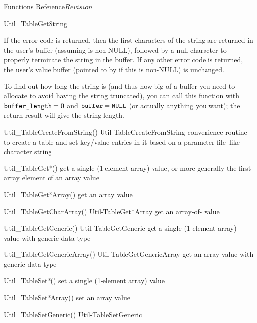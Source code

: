 \begin{cactuspart}{ Functions Reference}{}{$Revision$}
\begin{FunctionDescription}{Util\_TableGetString}
\begin{Discussion}
If the error code  is returned,
then the first  characters of the string are
returned in the user's buffer (assuming  is non-NULL),
followed by a null character to properly terminate the string in the
buffer.  If any other error code is returned, the user's value buffer
(pointed to by  if this is non-NULL) is unchanged.

To find out how long the string is (and thus how big of a buffer you
need to allocate to avoid having the string truncated), you can call
this function with $\texttt{buffer\_length} = 0$ and $\texttt{buffer} = \texttt{NULL}$
(or actually anything you want); the return result will give the
string length.
\end{Discussion}

\begin{SeeAlsoSection}
\begin{SeeAlso2} {Util\_TableCreateFromString()} {Util-TableCreateFromString}
convenience routine to create a table and set key/value entries
in it based on a parameter-file--like character string
\end{SeeAlso2}
\begin{SeeAlso}{Util\_TableGet*()}
get a single (1-element array) value,
or more generally the first array element of an array value
\end{SeeAlso}
\begin{SeeAlso}{Util\_TableGet*Array()}
get an array value
\end{SeeAlso}
\begin{SeeAlso2} {Util\_TableGetCharArray()} {Util-TableGet*Array}
get an array-of- value
\end{SeeAlso2}
\begin{SeeAlso2} {Util\_TableGetGeneric()} {Util-TableGetGeneric}
get a single (1-element array) value with generic data type
\end{SeeAlso2}
\begin{SeeAlso2} {Util\_TableGetGenericArray()} {Util-TableGetGenericArray}
get an array value with generic data type
\end{SeeAlso2}
\begin{SeeAlso}{Util\_TableSet*()}
set a single (1-element array) value
\end{SeeAlso}
\begin{SeeAlso}{Util\_TableSet*Array()}
set an array value
\end{SeeAlso}
\begin{SeeAlso2} {Util\_TableSetGeneric()} {Util-TableSetGeneric}

\end{SeeAlso2}
\end{SeeAlsoSection}
\end{FunctionDescription}
\end{cactuspart}
